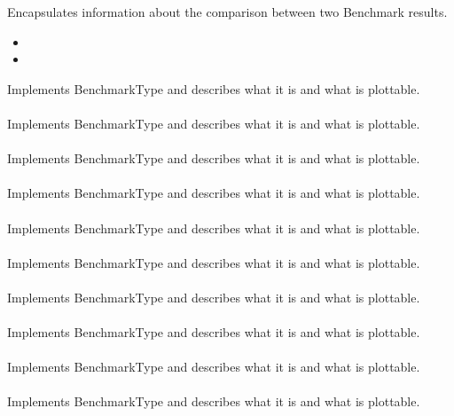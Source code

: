 \label{f:29}
{Encapsulates information about the comparison between two Benchmark results.}
{
  \begin{itemize}
    \item {}
    \item {}
  \end{itemize}
}

\label{f:30}
{Implements BenchmarkType and describes what it is and what is plottable.}
{\\}{\\}
\label{f:31}
{Implements BenchmarkType and describes what it is and what is plottable.}
{\\}{\\}
\label{f:32}
{Implements BenchmarkType and describes what it is and what is plottable.}
{\\}{\\}
\label{f:34}
{Implements BenchmarkType and describes what it is and what is plottable.}
{\\}{\\}
\label{f:35}
{Implements BenchmarkType and describes what it is and what is plottable.}
{\\}{\\}
\label{f:36}
{Implements BenchmarkType and describes what it is and what is plottable.}
{\\}{\\}
\label{f:37}
{Implements BenchmarkType and describes what it is and what is plottable.}
{\\}{\\}
\label{f:38}
{Implements BenchmarkType and describes what it is and what is plottable.}
{\\}{\\}
\label{f:39}
{Implements BenchmarkType and describes what it is and what is plottable.}
{\\}{\\}
\label{f:40}
{Implements BenchmarkType and describes what it is and what is plottable.}
{\\}{\\}


